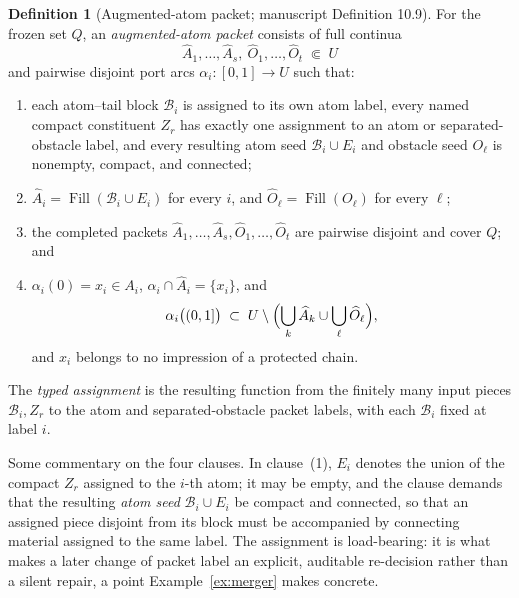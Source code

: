 \documentclass[11pt,reqno]{amsart}
\theoremstyle{definition}
\newtheorem{definition}[theorem]{Definition}
\theoremstyle{remark}
\newcommand{\Fill}{\operatorname{Fill}}
\begin{document}
\begin{definition}[Augmented-atom packet; manuscript Definition 10.9]\label{def:packet}
For the frozen set $Q$, an \emph{augmented-atom packet} consists of full continua
\[
\widehat A_1,\dots,\widehat A_s,\
\widehat O_1,\dots,\widehat O_t\;\Subset\;U
\]
and pairwise disjoint port arcs $\alpha_i\colon[0,1]\to U$ such that:
\begin{enumerate}
\item each atom--tail block $\mathcal B_i$ is assigned to its own atom label, every
named compact constituent $Z_r$ has exactly one assignment to an atom or
separated-obstacle label, and every resulting atom seed $\mathcal B_i\cup E_i$ and
obstacle seed $O_\ell$ is nonempty, compact, and connected;
\item $\widehat A_i=\Fill(\mathcal B_i\cup E_i)$ for every $i$, and
$\widehat O_\ell=\Fill(O_\ell)$ for every $\ell$;
\item the completed packets
$\widehat A_1,\dots,\widehat A_s,\widehat O_1,\dots,\widehat O_t$ are pairwise
disjoint and cover $Q$; and
\item $\alpha_i(0)=x_i\in A_i$, $\alpha_i\cap\widehat A_i=\{x_i\}$, and
\[
\alpha_i\bigl((0,1]\bigr)\;\subset\;
U\setminus\Bigl(\bigcup_{k}\widehat A_k\cup\bigcup_{\ell}\widehat O_\ell\Bigr),
\]
and $x_i$ belongs to no impression of a protected chain.
\end{enumerate}
The \emph{typed assignment} is the resulting function from the finitely
many input pieces $\mathcal B_i,Z_r$ to the atom and separated-obstacle packet
labels, with each $\mathcal B_i$ fixed at label $i$.
\end{definition}

Some commentary on the four clauses. In clause~(1), $E_i$ denotes the
union of the compact $Z_r$ assigned to the $i$-th atom; it may be empty,
and the clause demands that the resulting \emph{atom seed}
$\mathcal B_i\cup E_i$ be compact and connected, so that an assigned piece
disjoint from its block must be accompanied by connecting material assigned
to the same label.  The assignment is load-bearing: it is what makes a later
change of packet label an explicit, auditable re-decision rather than a silent repair, a point
Example~\ref{ex:merger} makes concrete.
\end{document}
